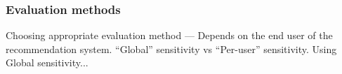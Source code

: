 \documentclass{beamer}
\begin{document}
\begin{frame}
\frametitle{Evaluation methods}
\begin{itemize}
\pitem Choosing appropriate evaluation method --- Depends on the end user of the recommendation system.
\pitem ``Global'' sensitivity vs ``Per-user'' sensitivity.
\pitem Using Global sensitivity...
\pause
\begin{figure}[h]
  \begin{center}
  \end{center}
\end{figure}
\end{itemize}
\end{frame}
\end{document}
